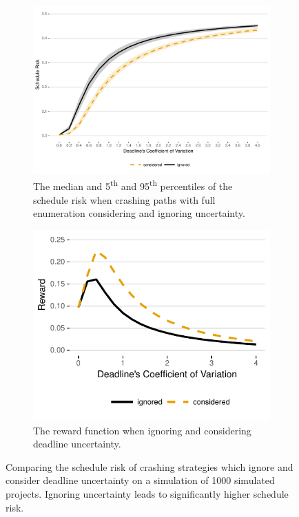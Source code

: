 \documentclass[11pt]{article}
\begin{document}
\begin{figure}[H]
\begin{center}
\begin{subfigure}[b]{0.85\linewidth}
\includegraphics[width=\textwidth]{2018-07-24_CoV-vary_reward.pdf}
\caption{The median and 5\textsuperscript{th} and 95\textsuperscript{th} percentiles of the schedule risk when crashing paths with full enumeration considering and ignoring uncertainty. }
\label{fig:consider_uncertainty}
\end{subfigure}

\begin{subfigure}[t]{0.4\linewidth}
\includegraphics[width=\textwidth]{2018-07-24_CoV-vary_reward-mean.pdf}
\caption{The reward function when ignoring and considering deadline uncertainty.}
\label{fig:reward}
\end{subfigure}

\caption{Comparing the schedule risk of crashing strategies which ignore and consider deadline uncertainty on a simulation of 1000 simulated projects. Ignoring uncertainty leads to significantly higher schedule risk.}
\end{center}
\end{figure}
\end{document}
